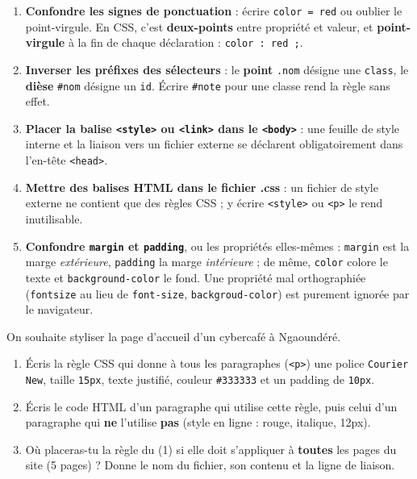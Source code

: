 \documentclass[11pt]{article}
\newcounter{popsec}
\newcounter{popsub}
\newcommand{\courssub}[1]{%
  \stepcounter{popsub}%
  \par\vspace{9pt}\noindent{\popxbold\fontsize{11.5}{13}\selectfont\color{popink}{\color{poporange}\thepopsec.\thepopsub}\hspace{6pt}#1}\par\nopagebreak\vspace{4pt}
}
\begin{document}
\begin{attention}
\begin{enumerate}
  \item \textbf{Confondre les signes de ponctuation} : écrire \texttt{color = red} ou oublier le point-virgule. En CSS, c'est \textbf{deux-points} entre propriété et valeur, et \textbf{point-virgule} à la fin de chaque déclaration : \texttt{color : red ;}.
  \item \textbf{Inverser les préfixes des sélecteurs} : le \textbf{point} \texttt{.nom} désigne une \texttt{class}, le \textbf{dièse} \texttt{\#nom} désigne un \texttt{id}. Écrire \texttt{\#note} pour une classe rend la règle sans effet.
  \item \textbf{Placer la balise \texttt{<style>} ou \texttt{<link>} dans le \texttt{<body>}} : une feuille de style interne et la liaison vers un fichier externe se déclarent obligatoirement dans l'en-tête \texttt{<head>}.
  \item \textbf{Mettre des balises HTML dans le fichier .css} : un fichier de style externe ne contient que des règles CSS ; y écrire \texttt{<style>} ou \texttt{<p>} le rend inutilisable.
  \item \textbf{Confondre \texttt{margin} et \texttt{padding}}, ou les propriétés elles-mêmes : \texttt{margin} est la marge \emph{extérieure}, \texttt{padding} la marge \emph{intérieure} ; de même, \texttt{color} colore le texte et \texttt{background-color} le fond. Une propriété mal orthographiée (\texttt{fontsize} au lieu de \texttt{font-size}, \texttt{backgroud-color}) est purement ignorée par le navigateur.
\end{enumerate}
\end{attention}

\courssub{Exercices d'entraînement}

\begin{exercice}
On souhaite styliser la page d'accueil d'un cybercafé à Ngaoundéré.
\begin{enumerate}
  \item Écris la règle CSS qui donne à tous les paragraphes (\texttt{<p>}) une police \texttt{Courier New}, taille \texttt{15px}, texte justifié, couleur \texttt{\#333333} et un padding de \texttt{10px}.
  \item Écris le code HTML d'un paragraphe qui utilise cette règle, puis celui d'un paragraphe qui \textbf{ne} l'utilise \textbf{pas} (style en ligne : rouge, italique, 12px).
  \item Où placeras-tu la règle du (1) si elle doit s'appliquer à \textbf{toutes} les pages du site (5 pages) ? Donne le nom du fichier, son contenu et la ligne de liaison.
\end{enumerate}
\end{exercice}
\end{document}
